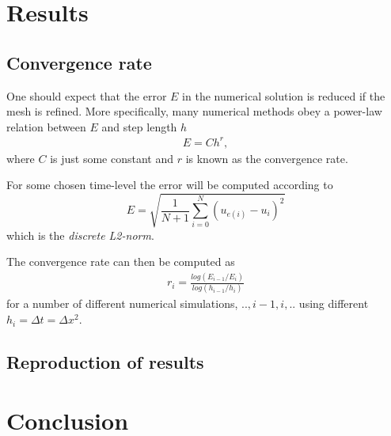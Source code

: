 \documentclass[11pt,a4paper,draft]{article}
\numberwithin{equation}{section}
\begin{document}
\section{Results}

\subsection{Convergence rate}

One should expect that the error $E$ in the numerical solution is reduced if the mesh is refined. More specifically, many numerical methods obey a power-law relation between $E$ and step length $h$
\begin{align*}
E=Ch^r,
\end{align*}
where $C$ is just some constant and $r$ is known as the convergence rate.  

For some chosen time-level the error will be computed according to 
\begin{equation}
E = \sqrt{\frac{1}{N+1} \sum_{i=0}^{N} (u_{e(i)}-u_{i})^2}
\end{equation}
which is the \emph{discrete L2-norm}. 

The convergence rate can then be computed as
\begin{align*}
r_i = \frac{log(E_{i-1}/E_i)}{log(h_{i-1}/ h_i)}
\end{align*}
for a number of different numerical simulations, $..,i-1,i,..$ using different $h_i=\Delta t = \Delta x^2 $.


\subsection{Reproduction of results}

\section{Conclusion}



\printbibliography
\end{document}
